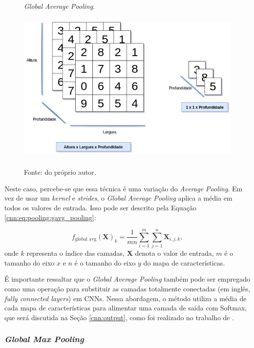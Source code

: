 \begin{figure}[H]
    \centering
    \caption{\textit{Global Average Pooling}.}
    \includegraphics[height=3in]{recursos/imagens/deep/global_average_pooling.png}
    \label{cnn:fig:8}
    
    \caption*{Fonte: do próprio autor.}
\end{figure}

Neste caso, percebe-se que essa técnica é uma variação do \textit{Average Pooling}. Em vez de usar um \textit{kernel} e \textit{strides}, o \textit{Global Average Pooling} aplica a média em todos os valores de entrada. Isso pode ser descrito pela Equação \ref{cnn:eq:pooling:gavg_pooling}:

\begin{equation}
    \label{cnn:eq:pooling:gavg_pooling}
    f_{\text{global avg}}(\boldsymbol{X})_{k} = \frac{1}{mn}\sum^{m}_{i=1}\sum^{n}_{j=1}\boldsymbol{X}_{i,j,k},
\end{equation}
onde $k$ representa o índice das camadas, $\boldsymbol{X}$ denota o valor de entrada, $m$ é o tamanho do eixo $x$ e $n$ é o tamanho do eixo $y$ do mapa de características.

É importante ressaltar que o \textit{Global Average Pooling} também pode ser empregado como uma operação para substituir as camadas totalmente conectadas (em inglês, \textit{fully connected layers}) em CNNs. Nessa abordagem, o método utiliza a média de cada mapa de características para alimentar uma camada de saída com Softmax, que será discutida na Seção \ref{cnn:output}, como foi realizado no trabalho de \cite{Kumar2021Multi-classPooling}.

\subsubsection{\textit{Global Max Pooling}}
\label{cnn:pooling:global_max_pooling}

